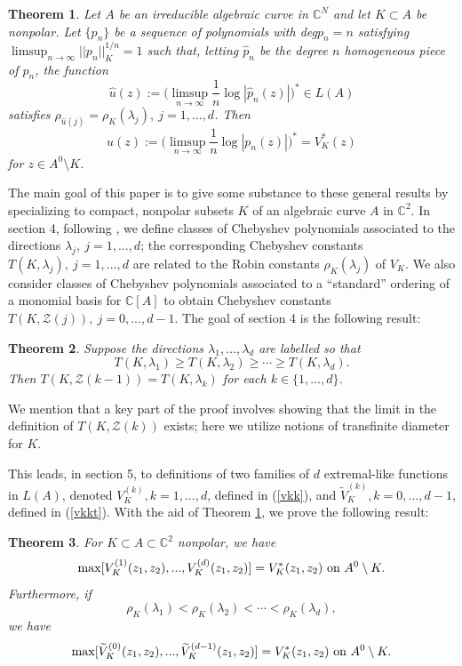 \documentclass[12pt]{article}
\numberwithin{equation}{section}
\newtheorem{theorem}{Theorem}[section]
\newcommand{\C}{\mathbb{C}}
\renewcommand{\hat}{\widehat}
\renewcommand{\tilde}{\widetilde}
\newcommand{\calZ}{\mathcal{Z}}
\begin{document}
\begin{theorem} \label{b98} Let $A$ be an irreducible algebraic curve in $\C^N$ and let $K\subset A$ be nonpolar. Let 
$\{p_n\}$ be a sequence of polynomials with deg$p_n=n$ satisfying $\limsup_{n\to \infty} ||p_n||_K^{1/n}=1$ such that, letting $\hat p_n$ 
be the degree $n$ homogeneous piece of $p_n$,  the function 
$$\hat u(z):=\bigl(\limsup_{n\to \infty}\frac{1}{n}\log |\hat p_n(z)|\bigr)^*\in L(A)$$
satisfies $\rho_{\hat u(j)}= \rho_K(\lambda_j), \ j=1,...,d$. Then 
$$u(z):=\bigl(\limsup_{n\to \infty}\frac{1}{n}\log |p_n(z)|\bigr)^*=V_K^*(z)$$ 
for $z\in A^0\setminus K$.


\end{theorem}



The main goal of this paper is to give some substance to these general results by specializing to compact, nonpolar subsets $K$ of an algebraic curve $A$ in $\C^2$. In section 4, following \cite{HM}, we define classes of Chebyshev polynomials associated to the directions $\lambda_j, \ j=1,...,d$; the corresponding Chebyshev constants $T(K,\lambda_j), \ j=1,...,d$ are related to the Robin constants $\rho_K(\lambda_j)$ of $V_K$. We also consider classes of Chebyshev polynomials associated to a ``standard'' ordering of a monomial basis for $\C[A]$ to obtain Chebyshev constants $T(K,\calZ(j)), \ j=0,...,d-1$. The goal of section 4 is the following result: 

\begin{theorem} \label{chebthm} Suppose the directions $\lambda_1,\ldots,\lambda_d$ are labelled so that 
$$T(K,\lambda_1)\geq T(K,\lambda_2) \geq\cdots\geq T(K,\lambda_d) .$$ Then  %
$T(K,\calZ(k-1))=T(K,\lambda_{k})$ for each $k\in\{1,\ldots,d\}$.  
\end{theorem}

\noindent We mention that a key part of the proof involves showing that the limit in the definition of $T(K,\calZ(k))$ exists; here we utilize notions of transfinite diameter for $K$. 


This leads, in section 5, to definitions of two families of $d$ extremal-like functions in $L(A)$, denoted $V_{K}^{(k)}, k=1,...,d$, defined in (\ref{vkk}), and $\tilde V_{K}^{(k)}, k=0,...,d-1$, defined in (\ref{vkkt}). With the aid of Theorem \ref{b98}, we prove the following result:

\begin{theorem} For $K\subset A\subset \C^2$ nonpolar, we have
$$\max [V_{K}^{(1)}(z_1,z_2),...,V_{K}^{(d)}(z_1,z_2)]= V_K^*(z_1,z_2)  \ \hbox{on} \ A^0 \setminus K.$$
Furthermore, if  
$$\rho_K(\lambda_1) < \rho_K(\lambda_2) < \cdots < \rho_K(\lambda_d),$$
we have
$$\max [\tilde V_{K}^{(0)}(z_1,z_2),...,\tilde V_{K}^{(d-1)}(z_1,z_2)]= V_K^*(z_1,z_2)  \ \hbox{on} \ A^0 \setminus K.$$

\end{theorem}
\end{document}
